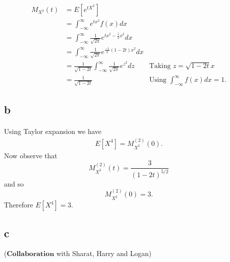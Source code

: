 \documentclass[letterpaper,12pt,oneside,onecolumn]{article}
\begin{document}
\paragraph{}
\begin{align*}
M_{X^2}(t) &= E[e^{tX^2}] \\
&= \int_{-\infty}^\infty e^{tx^2}f(x)dx \\
&=\int_{-\infty}^\infty \frac{1}{\sqrt{2\pi}}e^{tx^2-\frac{1}{2}x^2}dx \\
&= \int_{-\infty}^\infty \frac{1}{\sqrt{2\pi}}e^{\frac{-1}{2}(1-2t)x^2}dx \\
&= \frac{1}{\sqrt{1-2t}}\int_{-\infty}^\infty \frac{1}{\sqrt{2\pi}}e^{z^2}dz &\text{Taking $z=\sqrt{1-2t}x$} \\
&= \frac{1}{\sqrt{1-2t}} &\text{Using $\int_{-\infty}^\infty f(x)dx = 1$}.
\end{align*}
\subsection{b}
\paragraph{}
Using Taylor expansion we have
\begin{align*}
E[X^4] = M_{X^2}^{(2)}(0).
\end{align*}
Now observe that
$$M_{X^2}^{(2)}(t) = \frac{3}{(1-2t)^{5/2}}$$
and so
$$M_{X^2}^{(2)}(0) = 3.$$
Therefore $E[X^4] = 3$.
\subsection{c}
($\textbf{Collaboration}$ with Sharat, Harry and Logan)
\end{document}
